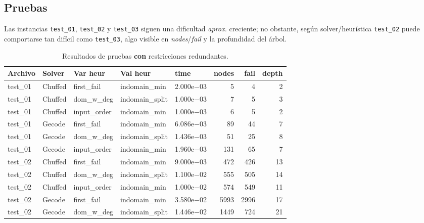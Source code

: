 
\subsection{Pruebas}\label{sec:01-sudoku-pruebas}
Las instancias \texttt{test\_01}, \texttt{test\_02} y \texttt{test\_03} siguen una dificultad \emph{aprox.} creciente; no obstante, según solver/heurística \texttt{test\_02} puede comportarse tan difícil como \texttt{test\_03}, algo visible en \emph{nodes}/\emph{fail} y la profundidad del árbol.

\begin{compactfloats}
\begin{table}[H]
  \centering
  \small
  \setlength{\tabcolsep}{10.8pt}
  \caption{Resultados de pruebas \textbf{con} restricciones redundantes.}
  \label{tab:pruebas-sudoku-on}
  \begin{tabular}{l l l l l r r r}
    \toprule
    \textbf{Archivo} & \textbf{Solver} & \textbf{Var heur} & \textbf{Val heur} & \textbf{time} & \textbf{nodes} & \textbf{fail} & \textbf{depth} \\
    \midrule
    test\_01 & Chuffed & first\_fail  & indomain\_min   & 2.000e$-$03 & 5    & 4    & 2 \\
    test\_01 & Chuffed & dom\_w\_deg  & indomain\_split & 1.000e$-$03 & 7    & 5    & 3 \\
    test\_01 & Chuffed & input\_order & indomain\_min   & 1.000e$-$03 & 6    & 5    & 2 \\
    test\_01 & Gecode  & first\_fail  & indomain\_min   & 6.086e$-$03 & 89   & 44   & 7 \\
    test\_01 & Gecode  & dom\_w\_deg  & indomain\_split & 1.436e$-$03 & 51   & 25   & 8 \\
    test\_01 & Gecode  & input\_order & indomain\_min   & 1.960e$-$03 & 131  & 65   & 7 \\
    \midrule
    test\_02 & Chuffed & first\_fail  & indomain\_min   & 9.000e$-$03 & 472  & 426  & 13 \\
    test\_02 & Chuffed & dom\_w\_deg  & indomain\_split & 1.100e$-$02 & 555  & 505  & 14 \\
    test\_02 & Chuffed & input\_order & indomain\_min   & 1.000e$-$02 & 574  & 549  & 11 \\
    test\_02 & Gecode  & first\_fail  & indomain\_min   & 3.580e$-$02 & 5993 & 2996 & 17 \\
    test\_02 & Gecode  & dom\_w\_deg  & indomain\_split & 1.446e$-$02 & 1449 & 724  & 21 \\

\end{tabular}
\end{table}
\end{compactfloats}
